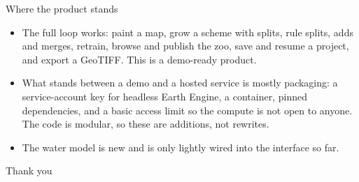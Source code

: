 \documentclass[aspectratio=169]{beamer}
\begin{document}
\begin{frame}{Where the product stands}
\begin{itemize}
  \item The full loop works: paint a map, grow a scheme with splits, rule splits, adds and merges,
  retrain, browse and publish the zoo, save and resume a project, and export a GeoTIFF. This is a
  demo-ready product.
  \item What stands between a demo and a hosted service is mostly packaging: a service-account key
  for headless Earth Engine, a container, pinned dependencies, and a basic access limit so the
  compute is not open to anyone. The code is modular, so these are additions, not rewrites.
  \item The water model is new and is only lightly wired into the interface so far.
\end{itemize}
\end{frame}

\begin{frame}
\centering
\vspace{1.5cm}
{\Large Thank you}
\vspace{0.5cm}


\end{frame}
\end{document}
